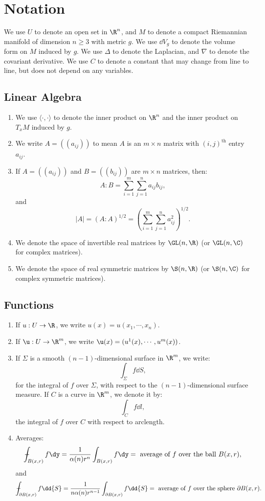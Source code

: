 \section{Notation}

We use $U$ to denote an open set in $\R^n$, and $M$ to denote a compact Riemannian manifold of dimension $n \ge 3$ with metric $g$. We use $\dd{V}_g$ to denote the volume form on $M$ induced by $g$. We use $\Delta$ to denote the Laplacian, and $\nabla$ to denote the covariant derivative. We use $C$ to denote a constant that may change from line to line, but does not depend on any variables.

\subsection{Linear Algebra}

\begin{enumerate}
  \item We use $\langle\cdot, \cdot\rangle$ to denote the inner product on $\R^n$ and the inner product on $T_xM$ induced by $g$.
  \item We write $A = ((a_{ij}))$ to mean $A$ is an $m \times n$ matrix with $(i, j)^{\text{th}}$ entry $a_{ij}$.
  \item If $A = ((a_{ij}))$ and $B = ((b_{ij}))$ are $m \times n$ matrices, then:
    \[%
      A : B = \sum_{i=1}^m \sum_{j=1}^n a_{ij} b_{ij}
    ,\]%
    and
    \[%
      |A| = (A : A)^{1/2} = \left(\sum_{i=1}^m \sum_{j=1}^n a_{ij}^2\right)^{1/2}
    .\]%
  \item We denote the space of invertible real matrices by $\GL(n, \R)$ (or $\GL(n, \C)$ for complex matrices).
  \item We denote the space of real symmetric matrices by $\S(n, \R)$ (or $\S(n, \C)$ for complex symmetric matrices).
\end{enumerate}

\subsection{Functions}

\begin{enumerate}
  \item If $u : U \to \R$, we write $u(x) = u(x_1, \cdots, x_n)$.
  \item If $\u : U \to \R^m$, we write $\u(x) = (u^1(x), \cdots, u^m(x))$.
  \item If $\Sigma$ is a smooth $(n-1)$-dimensional surface in $\R^m$, we write:
    \[%
      \int_\Sigma f \dd{S}
    ,\]%
    for the integral of $f$ over $\Sigma$, with respect to the $(n-1)$-dimensional surface measure. If $C$ is a curve in $\R^m$, we denote it by:
    \[%
      \int_C f \dd{l}
    ,\]%
    the integral of $f$ over $C$ with respect to arclength.
  \item Averages:
    \[%
      \dashint_{B(x,r)} f \dy = \frac{1}{\alpha(n)r^n} \int_{B(x,r)} f \dy =~\text{average of $f$ over the ball $B(x,r)$}
    ,\]%
    and
    \[%
      \dashint_{\partial B(x,r)} f \dd{S} = \frac{1}{n\alpha(n)r^{n-1}} \int_{\partial B(x,r)} f \dd{S} =~\text{average of $f$ over the sphere $\partial B(x,r)$}
    .\]%
\end{enumerate}

